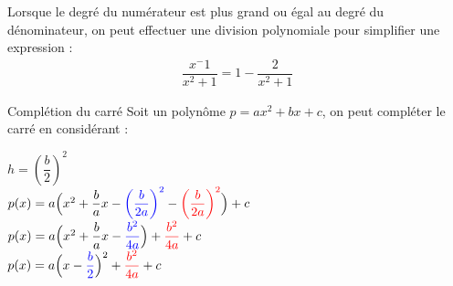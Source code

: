 \documentclass[2pt]{report}
\begin{document}
\begin{multicols*}{3}
\begin{note}{}{}
    Lorsque le degré du numérateur est plus grand ou égal au degré du dénominateur, on peut effectuer une division 
    polynomiale pour simplifier une expression : 
    \begin{align*}
      \dfrac{x^-1}{x^2 +1} = 1 - \dfrac{2}{x^2 +1}
    \end{align*}
\end{note}


\begin{Concept}{Complétion du carré}{}
  Soit un polynôme $p = ax^2 + bx + c$, on peut compléter le carré en considérant : 
  \begin{center}
  $h = \left(\dfrac{b}{2}\right)^2$ \\ 
  $p(x) = a\Bigl(x^2 + \dfrac{b}{a}x - \textcolor{blue}{\left(\dfrac{b}{2a}\right)^2} 
  - \textcolor{red}{\left(\dfrac{b}{2a}\right)^2}\Bigr)  + c  $ \\
  $p(x) = a\Bigl(x^2 + \dfrac{b}{a} x - \textcolor{blue}{\dfrac{b^2}{4a}}\Bigr) + \textcolor{red}{\dfrac{b^2}{4a}}  + c  $ \\ 
  $p(x) = a\Bigl(x - \textcolor{blue}{\dfrac{b}{2}}\Bigr)^2 +  
  \textcolor{red}{\dfrac{b^2}{4a}}  + c  $

  \end{center}
  
\end{Concept}

\end{multicols*}
\end{document}
